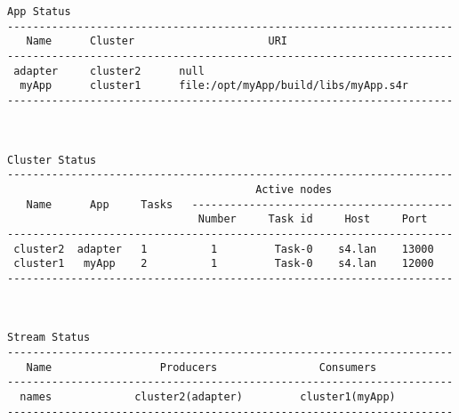 \begin{verbatim}
App Status
----------------------------------------------------------------------
   Name      Cluster                     URI
----------------------------------------------------------------------
 adapter     cluster2      null
  myApp      cluster1      file:/opt/myApp/build/libs/myApp.s4r
----------------------------------------------------------------------



Cluster Status
----------------------------------------------------------------------
                                       Active nodes
   Name      App     Tasks   -----------------------------------------
                              Number     Task id     Host     Port
----------------------------------------------------------------------
 cluster2  adapter   1          1         Task-0    s4.lan    13000
 cluster1   myApp    2          1         Task-0    s4.lan    12000
----------------------------------------------------------------------



Stream Status
----------------------------------------------------------------------
   Name                 Producers                Consumers
----------------------------------------------------------------------
  names             cluster2(adapter)         cluster1(myApp)
----------------------------------------------------------------------
\end{verbatim}